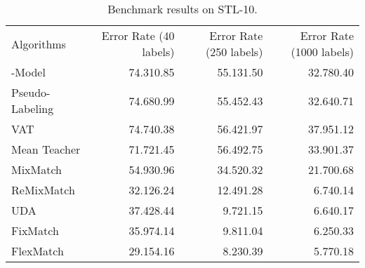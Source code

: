 \begin{table}[h!]
\centering
\caption{Benchmark results on STL-10. }
\label{tb-benchmark-stl}
\begin{adjustbox}{width=\columnwidth,center}
\begin{tabular}{lrrr}
\toprule
Algorithms & Error Rate (40 labels) & Error Rate (250 labels) & Error Rate (1000 labels) \\  \cmidrule(r){1-1} \cmidrule(l){2-2} \cmidrule(l){3-3} \cmidrule(l){4-4}
-Model~\citep{rasmus2015semi}   &74.31{\scriptsize 0.85}    &55.13{\scriptsize 1.50}  &32.78{\scriptsize 0.40}    \\ 

Pseudo-Labeling~\citep{lee2013pseudo}  & 74.68{\scriptsize 0.99}   & 55.45{\scriptsize 2.43}   & 32.64{\scriptsize 0.71}  \\

VAT~\citep{miyato2018virtual}&74.74{\scriptsize 0.38}   &56.42{\scriptsize 1.97} &37.95{\scriptsize 1.12}  \\

Mean Teacher~\citep{tarvainen2017mean}  &71.72{\scriptsize 1.45} &56.49{\scriptsize 2.75} &33.90{\scriptsize 1.37}   \\ 

MixMatch~\citep{berthelot2019mixmatch}    &54.93{\scriptsize 0.96} &34.52{\scriptsize 0.32}  &21.70{\scriptsize 0.68}  \\ 

ReMixMatch~\citep{berthelot2019remixmatch} &32.12{\scriptsize 6.24} &12.49{\scriptsize 1.28} &6.74{\scriptsize 0.14}     \\

UDA~\citep{xie2020unsupervised} &    37.42{\scriptsize 8.44}  & 9.72{\scriptsize 1.15}  & 6.64{\scriptsize 0.17}       \\

FixMatch~\citep{sohn2020fixmatch} &     35.97{\scriptsize 4.14} & 9.81{\scriptsize 1.04} & 6.25{\scriptsize 0.33}   \\

FlexMatch           & 29.15{\scriptsize 4.16}  & 8.23{\scriptsize 0.39}  & 5.77{\scriptsize 0.18}      \\ \bottomrule
\end{tabular}
\end{adjustbox}
\end{table}


